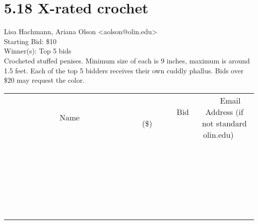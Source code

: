\documentclass[11pt]{article}
\begin{document}
					\section*{5.18 X-rated crochet}
					Lisa Hachmann, Ariana Olson <aolson@olin.edu> \\
					Starting Bid: \$10 \\
					Winner(s): Top 5 bids \\
					Crocheted stuffed penises. Minimum size of each is 9 inches, maximum is around 1.5 feet. Each of the top 5 bidders receives their own cuddly phallus. Bids over \$20 may request the color. \\
					[6ex]
					\begin{tabular}{c c c}
						~~~~~~~~~~~~~Name~~~~~~~~~~~~~ & ~~~~~~~~~Bid (\$)~~~~~~~~~ & ~~~Email Address (if not standard olin.edu)~~~ \\
				
 & & \\
\hline
 & & \\
\hline
 & & \\
\hline
 & & \\
\hline
 & & \\
\hline
 & & \\
\hline
 & & \\
\hline
 & & \\
\hline
 & & \\
\hline
 & & \\
\hline
 & & \\
\hline
 & & \\
\hline
 & & \\
\hline
 & & \\
\hline
 & & \\
\hline
 & & \\
\hline
 & & \\
\hline
 & & \\
\hline
 & & \\
\hline
 & & \\
\hline
 & & \\
\hline
 & & \\
\hline
 & & \\
\hline
 & & \\
\hline
 & & \\
\hline
 & & \\
\hline
					\end{tabular}
					\clearpage
				
\end{document}
